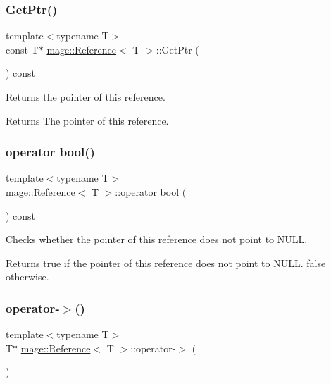 \subsubsection{\texorpdfstring{Get\+Ptr()}{GetPtr()}}
{\footnotesize\ttfamily template$<$typename T$>$ \\
const T$\ast$ \hyperlink{classmage_1_1_reference}{mage\+::\+Reference}$<$ T $>$\+::Get\+Ptr (\begin{DoxyParamCaption}{ }\end{DoxyParamCaption}) const}

Returns the pointer of this reference.

\begin{DoxyReturn}{Returns}
The pointer of this reference. 
\end{DoxyReturn}
\hypertarget{classmage_1_1_reference_ab662fe14ad3fa6a22ba5cc8d51354630}{}\label{classmage_1_1_reference_ab662fe14ad3fa6a22ba5cc8d51354630} 
\subsubsection{\texorpdfstring{operator bool()}{operator bool()}}
{\footnotesize\ttfamily template$<$typename T$>$ \\
\hyperlink{classmage_1_1_reference}{mage\+::\+Reference}$<$ T $>$\+::operator bool (\begin{DoxyParamCaption}{ }\end{DoxyParamCaption}) const}

Checks whether the pointer of this reference does not point to {\ttfamily N\+U\+LL}.

\begin{DoxyReturn}{Returns}
{\ttfamily true} if the pointer of this reference does not point to {\ttfamily N\+U\+LL}. {\ttfamily false} otherwise. 
\end{DoxyReturn}
\hypertarget{classmage_1_1_reference_a70e8990c4f4d879692fc2cd28cb6dd88}{}\label{classmage_1_1_reference_a70e8990c4f4d879692fc2cd28cb6dd88} 
\subsubsection{\texorpdfstring{operator-\/$>$()}{operator->()}\hspace{0.1cm}{\footnotesize\ttfamily [1/2]}}
{\footnotesize\ttfamily template$<$typename T$>$ \\
T$\ast$ \hyperlink{classmage_1_1_reference}{mage\+::\+Reference}$<$ T $>$\+::operator-\/$>$ (\begin{DoxyParamCaption}{ }\end{DoxyParamCaption})}

